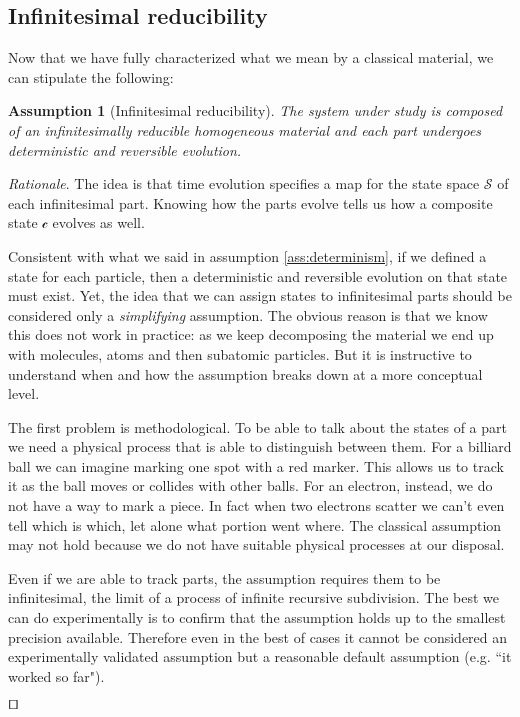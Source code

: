 \documentclass[smallextended]{svjour3}
\numberwithin{equation}{section}
\newenvironment{rationale}{\emph{Rationale}.}{\hfill\(\qed\)}
\newtheorem{assump}{Assumption}
\theoremstyle{definition}
\newenvironment{rationale}{\emph{Rationale}.}{\qed}
\begin{document}
\subsection{Infinitesimal reducibility}
\label{subsec:infinitesimal_reducibility}

Now that we have fully characterized what we mean by a classical material, we can stipulate the following:

\begin{assump}[Infinitesimal reducibility]\label{ass:infinitesimal_reducibility}
	The system under study is composed of an infinitesimally reducible homogeneous material and each part undergoes deterministic and reversible evolution.
\end{assump}

\begin{rationale}
	The idea is that time evolution specifies a map for the state space $\mathcal{S}$ of each infinitesimal part. Knowing how the parts evolve tells us how a composite state $\mathcal{c}$ evolves as well.
	
	Consistent with what we said in assumption \ref{ass:determinism}, if we defined a state for each particle, then a deterministic and reversible evolution on that state must exist. Yet, the idea that we can assign states to infinitesimal parts should be considered only a \emph{simplifying} assumption. The obvious reason is that we know this does not work in practice: as we keep decomposing the material we end up with molecules, atoms and then subatomic particles. But it is instructive to understand when and how the assumption breaks down at a more conceptual level.
	
	The first problem is methodological. To be able to talk about the states of a part we need a physical process that is able to distinguish between them. For a billiard ball we can imagine marking one spot with a red marker. This allows us to track it as the ball moves or collides with other balls. For an electron, instead, we do not have a way to mark a piece. In fact when two electrons scatter we can't even tell which is which, let alone what portion went where. The classical assumption may not hold because we do not have suitable physical processes at our disposal.
	
    Even if we are able to track parts, the assumption requires them to be infinitesimal, the limit of a process of infinite recursive subdivision. The best we can do experimentally is to confirm that the assumption holds up to the smallest precision available. Therefore even in the best of cases it cannot be considered an experimentally validated assumption but a reasonable default assumption (e.g. ``it worked so far").
	

\end{rationale}
\end{document}
